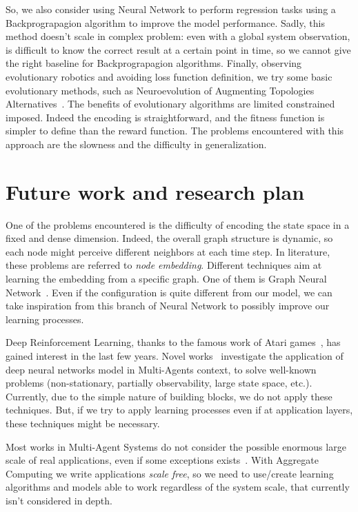 \documentclass[conference]{IEEEtran}
\begin{document}
So, we also consider using Neural Network to perform regression tasks using a Backprograpagion algorithm to
improve the model performance. 
Sadly, this method doesn't scale in complex problem: even with a global system observation, is difficult to know the correct result at a certain point in time, so 
we cannot give the right baseline for Backprograpagion algorithms.
%
Finally, observing evolutionary robotics and avoiding loss function definition, we try some basic evolutionary methods, such as Neuroevolution of Augmenting Topologies Alternatives~\cite{DBLP:journals/ec/StanleyM02}.
The benefits of evolutionary algorithms are limited constrained imposed. Indeed the encoding is straightforward, and the fitness function is simpler to define than the reward function.
The problems encountered with this approach are the slowness and the difficulty in generalization.
%
\section{Future work and research plan}
One of the problems encountered is the difficulty of encoding the state space in a fixed and dense dimension. Indeed, the overall graph structure is dynamic, so each node might perceive different neighbors at each time step.
In literature, these problems are referred to \emph{node embedding}. Different techniques aim at learning the embedding from a specific graph. One of them is Graph Neural Network~\cite{DBLP:journals/tnn/ScarselliGTHM09}.
Even if the configuration is quite different from our model, we can take inspiration from this branch of Neural Network to possibly improve our learning processes.

Deep Reinforcement Learning, thanks to the famous work of Atari games~\cite{DBLP:journals/corr/HosuR16}, has gained interest in the last few years. Novel works~\cite{DBLP:journals/aamas/Hernandez-LealK19} investigate the application of deep neural networks model in Multi-Agents context, 
to solve well-known problems (non-stationary, partially observability, large state space, etc.). Currently, due to the simple nature of building blocks, we do not apply these techniques. But, if we try to apply learning processes even if
at application layers, these techniques might be necessary.

Most works in Multi-Agent Systems do not consider the possible enormous large scale of real applications, even if some exceptions exists~\cite{nguyen2018reinforcement}. With Aggregate Computing we write applications \emph{scale free}, so we need to use/create learning algorithms and models able to work
regardless of the system scale, that currently isn't considered in depth.
\end{document}
